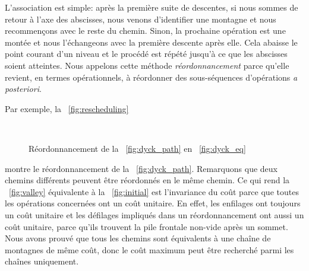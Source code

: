 L'association est simple: après la première suite de descentes, si
nous sommes de retour à l'axe des abscisses, nous venons d'identifier
une montagne et nous recommençons avec le reste du chemin. Sinon, la
prochaine opération est une montée et nous l'échangeons avec la
première descente après elle. Cela abaisse le point courant d'un
niveau et le procédé est répété jusqu'à ce que les abscisses soient
atteintes. Nous appelons cette méthode
\emph{réordonnancement} parce
qu'elle revient, en termes opérationnels, à réordonner des
sous-séquences d'opérations \emph{a posteriori}.

Par exemple, la \fig~\vref{fig:rescheduling}
\begin{figure}
\centering
{}
\qquad
{}\\
\qquad
{}
\caption{Réordonnancement de la \fig~\ref{fig:dyck_path} en  \fig~\ref{fig:dyck_eq}}
\label{fig:rescheduling}
\end{figure}
montre le réordonnancement de la \fig~\vref{fig:dyck_path}. Remarquons
que deux chemins différents peuvent être réordonnés en le même
chemin. Ce qui rend la \fig~\ref{fig:valley} équivalente à la
\fig~\ref{fig:initial} est l'invariance du coût parce que toutes les
opérations concernées ont un coût unitaire. En effet, les enfilages
ont toujours un coût unitaire et les défilages impliqués dans un
réordonnancement ont aussi un coût unitaire, parce qu'ils trouvent la
pile frontale non-vide après un sommet. Nous avons prouvé que tous les
chemins sont équivalents à une chaîne de montagnes de même coût, donc
le coût maximum peut être recherché parmi les chaînes uniquement.

